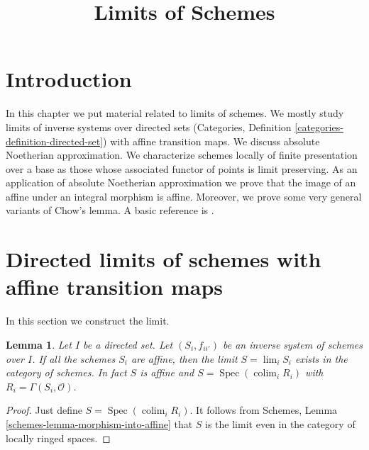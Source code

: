 \documentclass{stacks-project}
\theoremstyle{plain}
\newtheorem{lemma}[subsection]{Lemma}
\theoremstyle{definition}
\theoremstyle{remark}
\numberwithin{equation}{subsection}
\def\lim{\mathop{\mathrm{lim}}\nolimits}
\def\colim{\mathop{\mathrm{colim}}\nolimits}
\def\Spec{\mathop{\mathrm{Spec}}}
\begin{document}
\title{Limits of Schemes}


\maketitle

\label{section-phantom}

\tableofcontents

\section{Introduction}
\label{section-introduction}

\noindent
In this chapter we put material related to limits of schemes. We mostly
study limits of inverse systems over directed sets
(Categories, Definition \ref{categories-definition-directed-set})
with affine transition maps. We discuss absolute Noetherian
approximation. We characterize schemes locally of finite presentation
over a base as those whose associated functor of points is limit
preserving. As an application of absolute Noetherian approximation
we prove that the image of an affine under an integral morphism is affine.
Moreover, we prove some very general variants of Chow's lemma.
A basic reference is \cite{EGA}.




\section{Directed limits of schemes with affine transition maps}
\label{section-limits}

\noindent
In this section we construct the limit.

\begin{lemma}
\label{lemma-directed-inverse-system-affine-schemes-has-limit}
Let $I$ be a directed set. Let $(S_i, f_{ii'})$ be an inverse system of
schemes over $I$.  If all the schemes $S_i$
are affine, then the limit $S = \lim_i S_i$ exists
in the category of schemes.
In fact $S$ is affine and $S = \Spec(\colim_i R_i)$
with $R_i = \Gamma(S_i, \mathcal{O})$.
\end{lemma}

\begin{proof}
Just define $S = \Spec(\colim_i R_i)$.
It follows from Schemes, Lemma \ref{schemes-lemma-morphism-into-affine}
that $S$ is the limit even in the category of locally ringed spaces.
\end{proof}
\end{document}
